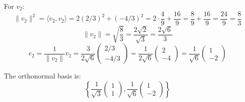 For $v_2$:
\[
\|v_2\|^2 = \langle v_2, v_2 \rangle = 2(2/3)^2 + (-4/3)^2 = 2 \cdot \frac{4}{9} + \frac{16}{9} = \frac{8}{9} + \frac{16}{9} = \frac{24}{9} = \frac{8}{3}
\]
\[
\|v_2\| = \sqrt{\frac{8}{3}} = \frac{2\sqrt{2}}{\sqrt{3}} = \frac{2\sqrt{6}}{3}
\]
\[
e_2 = \frac{1}{\|v_2\|} v_2 = \frac{3}{2\sqrt{6}} \begin{pmatrix} 2/3 \\ -4/3 \end{pmatrix} = \frac{1}{2\sqrt{6}} \begin{pmatrix} 2 \\ -4 \end{pmatrix} = \frac{1}{\sqrt{6}} \begin{pmatrix} 1 \\ -2 \end{pmatrix}
\]

The orthonormal basis is:
\[
\left\{ \frac{1}{\sqrt{3}} \begin{pmatrix} 1 \\ 1 \end{pmatrix}, \frac{1}{\sqrt{6}} \begin{pmatrix} 1 \\ -2 \end{pmatrix} \right\}
\]
